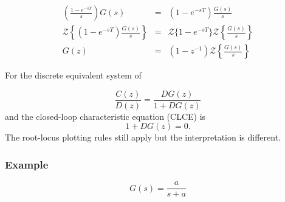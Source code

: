 \begin{slide}\label{slides:l12s13}
	
	\begin{eqnarray*}
		\left(\frac{1-e^{-sT}}{s}\right)G(s) & = & (1-e^{-sT})\frac{G(s)}{s} \\
		\mathcal{Z}\left\{(1-e^{-sT})\frac{G(s)}{s}\right\} & = & \mathcal{Z}\{1-e^{-sT}\}\mathcal{Z}\left\{\frac{G(s)}{s}\right\} \\
		G(z) & = & (1-z^{-1}) \mathcal{Z}\left\{\frac{G(s)}{s}\right\}
	\end{eqnarray*}
\end{slide}

For the discrete equivalent system of 

$$\frac{C(z)}{D(z)} = \frac{DG(z)}{1+DG(z)}$$ and the closed-loop characteristic equation (CLCE) is $$1+DG(z)=0.$$ The root-locus plotting rules still apply but the interpretation is different. 

\subsubsection*{Example}

$$G(s)=\frac{a}{s+a}$$

